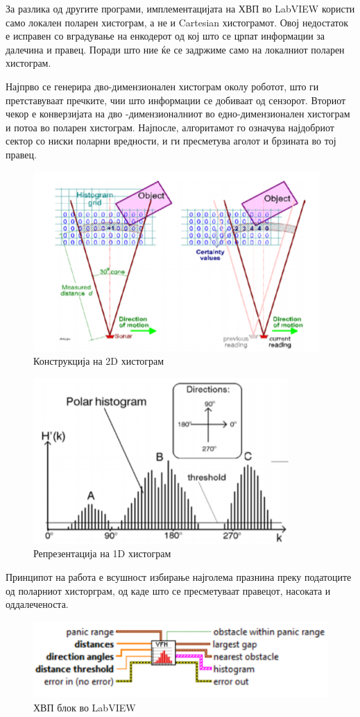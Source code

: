 \documentclass{article}
\begin{document}
За разлика од другите програми, имплементацијата на ХВП во LabVIEW користи само локален поларен хистограм, а не и Cartesian хистограмот. Овој недостаток е исправен со вградување на енкодерот од кој што се црпат информации за далечина и правец. Поради што ние ќе се задржиме само на локалниот поларен хистограм.

Најпрво се генерира дво-димензионален хистограм околу роботот, што ги претставуваат пречките, чии што информации се добиваат од сензорот. Вториот чекор е конверзијата на дво -димензионалниот во едно-димензионален хистограм и потоа во поларен хистограм. Најпосле, алгоритамот го означува најдобриот сектор со ниски поларни вредности, и ги пресметува аголот и брзината во тој правец.

\begin{figure}[H]
\centering
\includegraphics[width=0.35\linewidth]{2d_his.png}
\caption{Конструкција на 2D хистограм}
\label{fig:2d_his.png}
\end{figure}

\begin{figure}[H]
\centering
\includegraphics[width=0.35\linewidth]{1d_his.png}
\caption{Репрезентација на 1D хистограм}
\label{fig:1d_his.png}
\end{figure}

Принципот на работа е всушност избирање најголема празнина преку податоците од поларниот хисторграм, од каде што се пресметуваат правецот, насоката и оддалеченоста.

\begin{figure}[H]
\centering
\includegraphics[width=0.5\linewidth]{vfh_lv.png}
\caption{ХВП блок во LabVIEW}
\label{fig:vfh_lv.png}
\end{figure}
\end{document}
